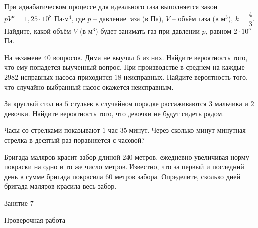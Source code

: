 \begin{homework}[number=3]
	\begin{listofex}
		\item При адиабатическом процессе для идеального газа выполняется закон \( pV^k=1,25 \cdot 10^8 \) Па\( \cdot \)м\( ^4 \), где \( p \) – давление газа (в Па), \( V \) – объём газа (в м\( ^3 \)), \( k=\dfrac{4}{3}\). Найдите, какой объём \( V \) (в м\( ^3 \)) будет занимать газ при давлении \( p \), равном \( 2 \cdot 10^5 \) Па.
		\item На экзамене \( 40 \) вопросов. Дима не выучил \( 6 \) из них. Найдите вероятность того, что ему попадется выученный вопрос.
		При производстве в среднем на каждые \( 2982 \) исправных насоса приходится \( 18 \) неисправных. Найдите вероятность того, что случайно выбранный насос окажется неисправным.
		\item За круглый стол на \( 5 \) стульев в случайном порядке рассаживаются \( 3 \) мальчика и \( 2 \) девочки. Найдите вероятность того, что девочки не будут сидеть рядом.	
		\item Часы со стрелками показывают \( 1 \) час \( 35 \) минут. Через сколько минут минутная стрелка в десятый раз поравняется с часовой?
		\item Бригада маляров красит забор длиной \( 240 \) метров, ежедневно увеличивая норму покраски на одно и то же число метров. Известно, что за первый и последний день в сумме бригада покрасила \( 60 \) метров забора. Определите, сколько дней бригада маляров красила весь забор.
	\end{listofex}
\end{homework}

\begin{class}[number=7]
	\begin{listofex}
		\item Занятие 7
	\end{listofex}
\end{class}

\begin{exam}
	\begin{listofex}
		\item Проверочная работа
	\end{listofex}
\end{exam}
